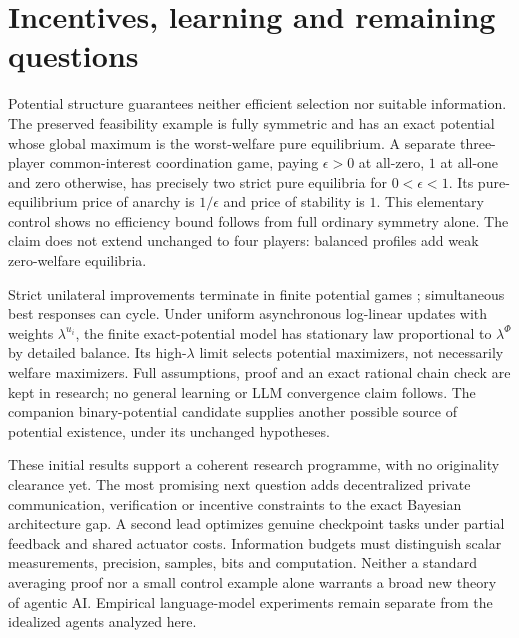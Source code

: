 \section{Incentives, learning and remaining questions}\label{sec:06-outlook-1}
Potential structure guarantees neither efficient selection nor suitable
information. The preserved feasibility example is fully symmetric and has
an exact potential whose global maximum is the worst-welfare pure equilibrium.
A separate three-player common-interest coordination game, paying
$\epsilon>0$ at all-zero, $1$ at all-one and zero otherwise, has precisely
two strict pure equilibria for $0<\epsilon<1$. Its pure-equilibrium price of
anarchy is $1/\epsilon$ and price of stability is $1$. This elementary control
shows no efficiency bound follows from full ordinary symmetry alone.
The claim does not extend unchanged to four players: balanced profiles add
weak zero-welfare equilibria.

Strict unilateral improvements terminate in finite potential games
\citep{monderer1996}; simultaneous best responses can cycle. Under uniform
asynchronous log-linear updates with weights $\lambda^{u_i}$, the finite
exact-potential model has stationary law proportional to $\lambda^\Phi$ by
detailed balance. Its high-$\lambda$ limit selects potential maximizers, not
necessarily welfare maximizers. Full assumptions, proof and an exact rational
chain check are kept in research; no general learning or LLM convergence
claim follows. The companion binary-potential candidate supplies another
possible source of potential existence, under its unchanged hypotheses.

These initial results support a coherent research programme, with no originality
clearance yet. The most promising next question adds decentralized private
communication, verification or incentive constraints to the exact Bayesian
architecture gap. A second lead optimizes genuine checkpoint tasks under
partial feedback and shared actuator costs. Information budgets must distinguish
scalar measurements, precision, samples, bits and computation. Neither a
standard averaging proof nor a small control example alone warrants a broad
new theory of agentic AI. Empirical language-model experiments remain separate
from the idealized agents analyzed here.
